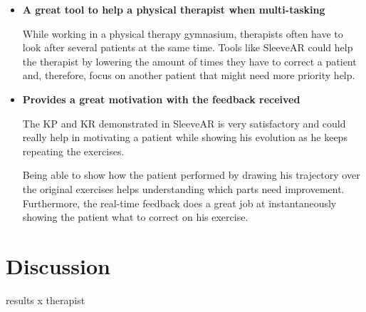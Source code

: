 \begin{itemize}
\item \textbf{A great tool to help a physical therapist when multi-tasking}

While working in a physical therapy gymnasium, therapists often have to look after several patients at the same time. Tools like SleeveAR could help the therapist by lowering the amount of times they have to correct a patient and, therefore, focus on another patient that might need more priority help.


\item \textbf{Provides a great motivation with the feedback received}

The \ac{KP} and \ac{KR} demonstrated in SleeveAR is very satisfactory and could really help in motivating a patient while showing his evolution as he keeps repeating the exercises.

Being able to show how the patient performed by drawing his trajectory over the original exercises helps understanding which parts need improvement. Furthermore, the real-time feedback does a great job at instantaneously showing the patient what to correct on his exercise.

\end{itemize}

\section{Discussion}

results x therapist 